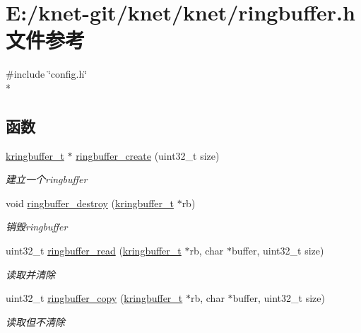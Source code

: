 \hypertarget{a00092}{}\section{E\+:/knet-\/git/knet/knet/ringbuffer.h 文件参考}
\label{a00092}
{\ttfamily \#include \char`\"{}config.\+h\char`\"{}}\\*
\subsection*{函数}
\begin{DoxyCompactItemize}
\item 
\hyperlink{a00056_a66d91f7667db1f0b2983fc25e1a20f1c_a66d91f7667db1f0b2983fc25e1a20f1c}{kringbuffer\+\_\+t} $\ast$ \hyperlink{a00092_a81244fe21f0b4fdcf45e66ae6257afaf_a81244fe21f0b4fdcf45e66ae6257afaf}{ringbuffer\+\_\+create} (uint32\+\_\+t size)
\begin{DoxyCompactList}\small\item\em 建立一个ringbuffer \end{DoxyCompactList}\item 
void \hyperlink{a00092_aa6135df0cc9bc827cae301626898dace_aa6135df0cc9bc827cae301626898dace}{ringbuffer\+\_\+destroy} (\hyperlink{a00056_a66d91f7667db1f0b2983fc25e1a20f1c_a66d91f7667db1f0b2983fc25e1a20f1c}{kringbuffer\+\_\+t} $\ast$rb)
\begin{DoxyCompactList}\small\item\em 销毁ringbuffer \end{DoxyCompactList}\item 
uint32\+\_\+t \hyperlink{a00092_acccb44d353cc569d1f39cf01125c88bf_acccb44d353cc569d1f39cf01125c88bf}{ringbuffer\+\_\+read} (\hyperlink{a00056_a66d91f7667db1f0b2983fc25e1a20f1c_a66d91f7667db1f0b2983fc25e1a20f1c}{kringbuffer\+\_\+t} $\ast$rb, char $\ast$buffer, uint32\+\_\+t size)
\begin{DoxyCompactList}\small\item\em 读取并清除 \end{DoxyCompactList}\item 
uint32\+\_\+t \hyperlink{a00092_a89fdbed1466be114d8200405db2e18a5_a89fdbed1466be114d8200405db2e18a5}{ringbuffer\+\_\+copy} (\hyperlink{a00056_a66d91f7667db1f0b2983fc25e1a20f1c_a66d91f7667db1f0b2983fc25e1a20f1c}{kringbuffer\+\_\+t} $\ast$rb, char $\ast$buffer, uint32\+\_\+t size)
\begin{DoxyCompactList}\small\item\em 读取但不清除 \end{DoxyCompactList}\item 

\end{DoxyCompactItemize}
